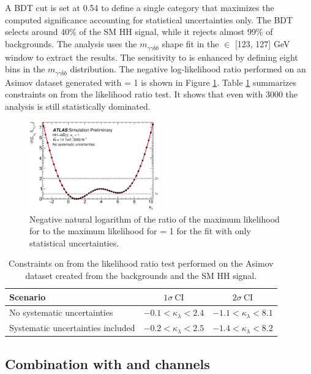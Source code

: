 A BDT cut is set at 0.54 to define a single category that maximizes the computed significance accounting for statistical uncertainties only. The BDT selects around 40\% of the SM HH signal, while it rejects almost 99\% of backgrounds. The analysis uses the $m_{\gamma\gamma\bar{b}b}$ shape fit in the \myy $\in$ [123, 127] GeV window to extract the results. The sensitivity to \kl is enhanced by defining eight bins in the $m_{\gamma\gamma\bar{b}b}$ distribution. The negative log-likelihood ratio performed on an Asimov dataset generated with \kl = 1 is shown in Figure \ref{fig:HL-LHC:36ifb:LH}. Table \ref{tab:HL-LHC:36ifb:kl} summarizes constraints on \kl from the likelihood ratio test. It shows that even with 3000 \ifb the analysis is still statistically dominated.
\begin{figure}[htbp]
    \centering
    \includegraphics[width=0.5\textwidth]{Ch6/Img/figures_bbyy_NoSyst_likelihoodCurve_-3to10.eps}
    \caption{Negative natural logarithm of the ratio of the maximum likelihood for \kl to the maximum likelihood for \kl = 1 for the fit with only statistical uncertainties.}
    \label{fig:HL-LHC:36ifb:LH}
\end{figure}

\begin{table}[htbp]
    \centering
    \begin{tabular}{lcc}
\hline \hline Scenario & $1 \sigma \ \mathrm{CI}$ & $2 \sigma \ \mathrm{CI}$ \\
\hline No systematic uncertainties & $-0.1<\kappa_{\lambda}<2.4$ & $-1.1<\kappa_{\lambda}<8.1$ \\
Systematic uncertainties included & $-0.2<\kappa_{\lambda}<2.5$ & $-1.4<\kappa_{\lambda}<8.2$ \\
\hline \hline
\end{tabular}
    \caption{Constraints on \kl from the likelihood ratio test performed on the Asimov dataset created from the backgrounds and the SM HH signal.}
    \label{tab:HL-LHC:36ifb:kl}
\end{table}

\subsection{Combination with \bbbb and \bbtt channels}

